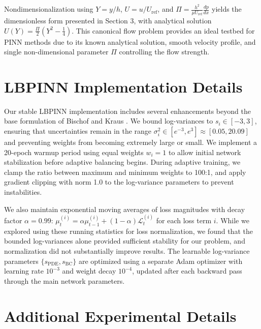\documentclass{article}
\begin{document}
Nondimensionalization using $Y = y/h$, $U = u/U_{\text{ref}}$, and $\Pi = \frac{h^2}{\mu U_{\text{ref}}}\frac{dp}{dx}$ yields the dimensionless form presented in Section 3, with analytical solution $U(Y) = \frac{\Pi}{2}(Y^2 - \frac{1}{4})$. This canonical flow problem provides an ideal testbed for PINN methods due to its known analytical solution, smooth velocity profile, and single non-dimensional parameter $\Pi$ controlling the flow strength.

\section{LBPINN Implementation Details}
\label{app:lbpinn}

Our stable LBPINN implementation includes several enhancements beyond the base formulation of Bischof and Kraus \citep{Bischof2021LBPINN}. We bound log-variances to $s_i \in [-3, 3]$, ensuring that uncertainties remain in the range $\sigma_i^2 \in [e^{-3}, e^3] \approx [0.05, 20.09]$ and preventing weights from becoming extremely large or small. We implement a 20-epoch warmup period using equal weights $w_i = 1$ to allow initial network stabilization before adaptive balancing begins. During adaptive training, we clamp the ratio between maximum and minimum weights to 100:1, and apply gradient clipping with norm 1.0 to the log-variance parameters to prevent instabilities.

We also maintain exponential moving averages of loss magnitudes with decay factor $\alpha = 0.99$: $\mu_t^{(i)} = \alpha \mu_{t-1}^{(i)} + (1-\alpha) \mathcal{L}_t^{(i)}$ for each loss term $i$. While we explored using these running statistics for loss normalization, we found that the bounded log-variances alone provided sufficient stability for our problem, and normalization did not substantially improve results. The learnable log-variance parameters $\{s_{\text{PDE}}, s_{\text{BC}}\}$ are optimized using a separate Adam optimizer with learning rate $10^{-3}$ and weight decay $10^{-4}$, updated after each backward pass through the main network parameters.

\section{Additional Experimental Details}
\label{app:experiment}
\end{document}
